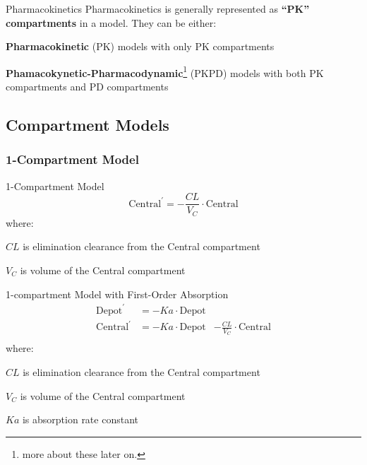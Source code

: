 \begin{frame}{Pharmacokinetics}
    Pharmacokinetics is generally represented as \textbf{``PK'' compartments} in a model.
    \vfill
    They can be either:
    \begin{vfilleditems}
        \item \textbf{Pharmacokinetic} (PK) models with only PK compartments
        \item \textbf{Phamacokynetic-Pharmacodynamic}\footnote{more about these later on.} (PKPD) models with both PK compartments and PD compartments
    \end{vfilleditems}
\end{frame}

\subsection{Compartment Models}
\subsubsection{1-Compartment Model}
\begin{frame}{1-Compartment Model}
    $$
        \text{Central}^{\prime} = -\frac{CL}{V_C} \cdot \text{Central}
    $$
    where:
    \begin{vfilleditems}
        \item $CL$ is elimination clearance from the Central compartment
        \item $V_C$ is volume of the Central compartment
    \end{vfilleditems}
\end{frame}

\begin{frame}{1-compartment Model with First-Order Absorption}
    $$
        \begin{aligned}
            \text{Depot}^{\prime}   & =        -Ka \cdot \text{Depot}                                        \\
            \text{Central}^{\prime} & = -Ka \cdot \text{Depot}        & -\frac{CL}{V_C} \cdot \text{Central} \\
        \end{aligned}
    $$
    where:
    \begin{vfilleditems}
        \item $CL$ is elimination clearance from the Central compartment
        \item $V_C$ is volume of the Central compartment
        \item $Ka$ is absorption rate constant
    \end{vfilleditems}

\end{frame}

